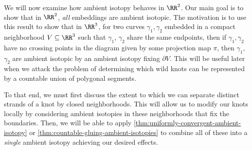 We will now examine how ambient isotopy behaves in $\RR^2$. Our main
goal is to show that in $\RR^2$, \emph{all} embeddings are ambient
isotopic. The motivation is to use this result to show that in
$\RR^3$, for two curves $\gamma_1, \gamma_2$ embedded in a compact
neighborhood $V \subseteq \RR^3$ such that $\gamma_1$, $\gamma_2$
share the same endpoints, then if $\gamma_1, \gamma_2$ have no
crossing points in the diagram given by some projection map $\pi$,
then $\gamma_1$, $\gamma_2$ are ambient isotopic by an ambient isotopy
fixing $\partial V$. This will be useful later when we attack the
problem of determining which wild knots can be represented by a
countable union of polygonal segments.

To that end, we must first discuss the extent to which we can separate
distinct strands of a knot by closed neighborhoods. This will allow us
to modify our knots locally by considering ambient isotopies in these
neighborhoods that fix the boundaries. Then, we will be able to apply
\cref{thm:uniformly-convergent-ambient-isotopy} or
\cref{thm:countable-gluing-ambient-isotopies} to combine all of these
into a \emph{single} ambient isotopy achieving our desired effects.







